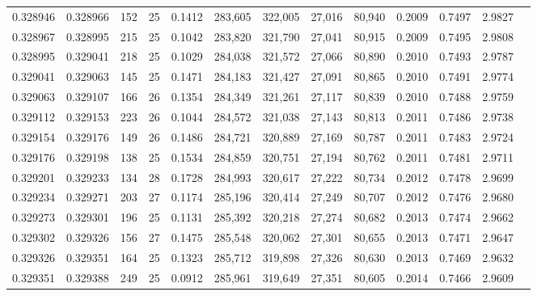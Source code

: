 \begin{tabular}{rrrrrrrrrrrrr}
0.328946 & 0.328966 &   152 &  25 &                                     0.1412 & 283,605 & 322,005 &  27,016 &  80,940 & 0.2009 & 0.7497 & 2.9827 \\
0.328967 & 0.328995 &   215 &  25 &                                     0.1042 & 283,820 & 321,790 &  27,041 &  80,915 & 0.2009 & 0.7495 & 2.9808 \\
0.328995 & 0.329041 &   218 &  25 &                                     0.1029 & 284,038 & 321,572 &  27,066 &  80,890 & 0.2010 & 0.7493 & 2.9787 \\
0.329041 & 0.329063 &   145 &  25 &                                     0.1471 & 284,183 & 321,427 &  27,091 &  80,865 & 0.2010 & 0.7491 & 2.9774 \\
0.329063 & 0.329107 &   166 &  26 &                                     0.1354 & 284,349 & 321,261 &  27,117 &  80,839 & 0.2010 & 0.7488 & 2.9759 \\
0.329112 & 0.329153 &   223 &  26 &                                     0.1044 & 284,572 & 321,038 &  27,143 &  80,813 & 0.2011 & 0.7486 & 2.9738 \\
0.329154 & 0.329176 &   149 &  26 &                                     0.1486 & 284,721 & 320,889 &  27,169 &  80,787 & 0.2011 & 0.7483 & 2.9724 \\
0.329176 & 0.329198 &   138 &  25 &                                     0.1534 & 284,859 & 320,751 &  27,194 &  80,762 & 0.2011 & 0.7481 & 2.9711 \\
0.329201 & 0.329233 &   134 &  28 &                                     0.1728 & 284,993 & 320,617 &  27,222 &  80,734 & 0.2012 & 0.7478 & 2.9699 \\
0.329234 & 0.329271 &   203 &  27 &                                     0.1174 & 285,196 & 320,414 &  27,249 &  80,707 & 0.2012 & 0.7476 & 2.9680 \\
0.329273 & 0.329301 &   196 &  25 &                                     0.1131 & 285,392 & 320,218 &  27,274 &  80,682 & 0.2013 & 0.7474 & 2.9662 \\
0.329302 & 0.329326 &   156 &  27 &                                     0.1475 & 285,548 & 320,062 &  27,301 &  80,655 & 0.2013 & 0.7471 & 2.9647 \\
0.329326 & 0.329351 &   164 &  25 &                                     0.1323 & 285,712 & 319,898 &  27,326 &  80,630 & 0.2013 & 0.7469 & 2.9632 \\
0.329351 & 0.329388 &   249 &  25 &                                     0.0912 & 285,961 & 319,649 &  27,351 &  80,605 & 0.2014 & 0.7466 & 2.9609 \\

\end{tabular}
